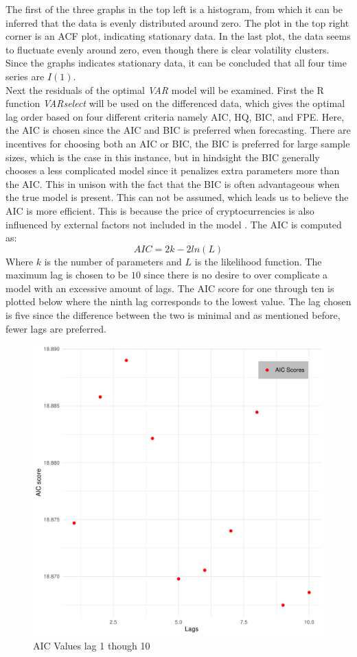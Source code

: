 \noindent The first of the three graphs in the top left is a histogram, from which it can be inferred that the data is evenly distributed around zero. The plot in the top right corner is an ACF plot, indicating stationary data. In the last plot, the data seems to fluctuate evenly around zero, even though there is clear volatility clusters. 
Since the graphs indicates stationary data, it can be concluded that all four time series are $I(1)$.\\

\noindent Next the residuals of the optimal \textit{VAR} model will be examined. First the R function \textit{VARselect} will be used on the differenced data, which gives the optimal lag order based on four different criteria namely AIC, HQ, BIC, and FPE. 
Here, the AIC is chosen since the AIC and BIC is preferred when forecasting. There are incentives for choosing both an AIC or BIC, the BIC is preferred for large sample sizes, which is the case in this instance, but in hindsight the BIC generally chooses a less complicated model since it penalizes extra parameters more than the AIC. This in unison with the fact that the BIC is often advantageous when the true model is present. This can not be assumed, which leads us to believe the AIC is more efficient. This is because the price of cryptocurrencies is also influenced by external factors not included in the model \cite{AICorBIC}. The AIC is computed as:
\begin{equation*}
    AIC=2k-2ln(L)
\end{equation*}
Where $k$ is the number of parameters and $L$ is the likelihood function.
The maximum lag is chosen to be $10$ since there is no desire to over complicate a model with an excessive amount of lags. The AIC score for one through ten is plotted below where the ninth lag corresponds to the lowest value. The lag chosen is five since the difference between the two is minimal and as mentioned before, fewer lags are preferred.
\begin{figure}[H]
    \centering
    \includegraphics[width=0.5\linewidth]{1.Projekt_kode/Billeder/Crypto_lags.pdf}
    \caption{AIC Values lag 1 though 10}
    \label{fig:enter-label}
\end{figure}
